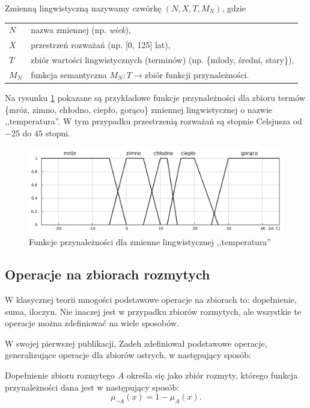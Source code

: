 \begin{definition} Zmienną lingwistyczną nazywamy czwórkę $(N,X,T,M_N)$, gdzie

\begin{tabular}{ll}
  $N$ & \qquad nazwa zmiennej (np. \textit{wiek}), \\
  $X$ & \qquad przestrzeń rozważań (np. [0, 125] lat), \\
  $T$ & \qquad zbiór wartości lingwistycznych (terminów) (np. \{młody, średni,
  stary\}), \\
  $M_N$ & \qquad funkcja semantyczna $M_N : T \rightarrow \textrm{zbiór funkcji
  przynależności}$.
\end{tabular}
\end{definition}

Na rysunku \ref{fig:zmienna_lingwistyczna} pokazane są przykładowe funkcje
przynależności dla zbioru termów \{mróz, zimno, chłodno, ciepło, gorąco\}
zmiennej lingwistycznej o nazwie ,,temperatura''. W tym przypadku przestrzenią
rozważań są stopnie Celsjusza od $-25$ do $45$ stopni.

\begin{figure}[ht]
  \includegraphics[width=\linewidth]
  	{chapters/fuzzylogic/zmienna_lingwistyczna}
  \caption{Funkcje przynależności dla zmienne lingwistycznej ,,temperatura''}
  \label{fig:zmienna_lingwistyczna}
\end{figure}

\subsection{Operacje na zbiorach rozmytych}
W klasycznej teorii mnogości podstawowe operacje na zbiorach to: dopełnienie,
suma, iloczyn. Nie inaczej jest w przypadku zbiorów rozmytych, ale wszystkie te
operacje można zdefiniować na wiele sposobów.

W swojej pierwszej publikacji, Zadeh \cite{zadeh1965fuzzy} zdefiniował
podstawowe operacje, generalizujące operacje dla zbiorów ostrych, w następujący
sposób:

\begin{definition}
Dopełnienie zbioru rozmytego $A$ określa się jako zbiór rozmyty, którego funkcja
przynależności dana jest w następujący sposób:
\begin{equation}
\mu_{\neg A}(x) = 1 - \mu_A(x).
\end{equation}
\end{definition}

